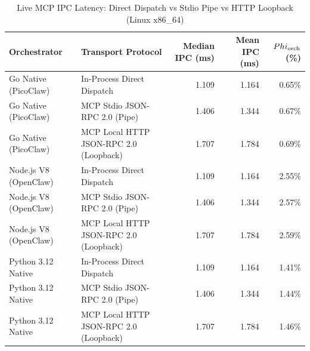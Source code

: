 \begin{table}[t]
\centering\small
\caption{Live MCP IPC Latency: Direct Dispatch vs Stdio Pipe vs HTTP Loopback (Linux x86_64)}
\label{tab:linux_mcp_transport}
\begin{tabular}{llrrr}
\toprule
Orchestrator & Transport Protocol & Median IPC (ms) & Mean IPC (ms) & $\\Phi_{\text{orch}}$ (\%) \\
\midrule
Go Native (PicoClaw) & In-Process Direct Dispatch & 1.109 & 1.164 & 0.65\% \\
Go Native (PicoClaw) & MCP Stdio JSON-RPC 2.0 (Pipe) & 1.406 & 1.344 & 0.67\% \\
Go Native (PicoClaw) & MCP Local HTTP JSON-RPC 2.0 (Loopback) & 1.707 & 1.784 & 0.69\% \\
Node.js V8 (OpenClaw) & In-Process Direct Dispatch & 1.109 & 1.164 & 2.55\% \\
Node.js V8 (OpenClaw) & MCP Stdio JSON-RPC 2.0 (Pipe) & 1.406 & 1.344 & 2.57\% \\
Node.js V8 (OpenClaw) & MCP Local HTTP JSON-RPC 2.0 (Loopback) & 1.707 & 1.784 & 2.59\% \\
Python 3.12 Native & In-Process Direct Dispatch & 1.109 & 1.164 & 1.41\% \\
Python 3.12 Native & MCP Stdio JSON-RPC 2.0 (Pipe) & 1.406 & 1.344 & 1.44\% \\
Python 3.12 Native & MCP Local HTTP JSON-RPC 2.0 (Loopback) & 1.707 & 1.784 & 1.46\% \\
\bottomrule
\end{tabular}
\end{table}

